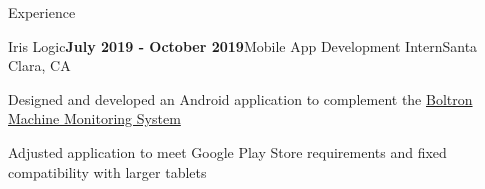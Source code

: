 \documentclass{resume}
\begin{document}
\begin{rSection}{\large Experience}
\begin{rSubsection}{Iris Logic}{\bf{July 2019 - October 2019}}{Mobile App Development Intern}{Santa Clara, CA }
\item Designed and developed an Android application to complement the \href{https://irislogic.com/boltron-machine-monitoring-system/}{Boltron Machine Monitoring System}
\item Adjusted application to meet Google Play Store requirements and fixed compatibility with larger tablets
\end{rSubsection}

\end{rSection}

\end{document}
